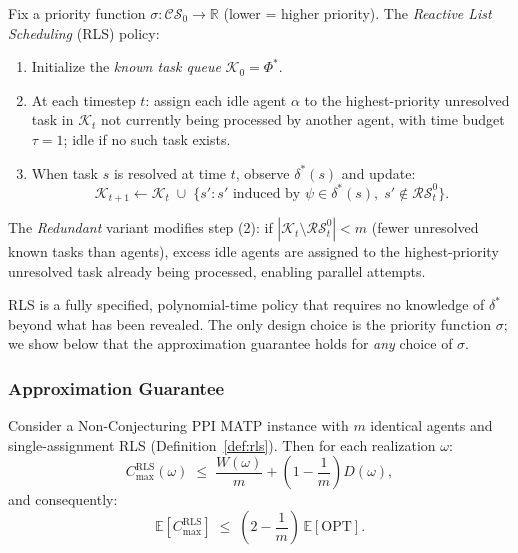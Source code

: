 \begin{definition}\label{def:rls}
Fix a priority function $\sigma:\mathcal{CS}_0\to\mathbb{R}$ (lower = higher priority). The \emph{Reactive List Scheduling} (RLS) policy:
\begin{enumerate}
    \item Initialize the \emph{known task queue} $\mathcal{K}_0 = \Phi^*$.
    \item At each timestep $t$: assign each idle agent $\alpha$ to the highest-priority unresolved task in $\mathcal{K}_t$ not currently being processed by another agent, with time budget $\tau=1$; idle if no such task exists.
    \item When task $s$ is resolved at time $t$, observe $\delta^*(s)$ and update:
    \[
    \mathcal{K}_{t+1} \leftarrow \mathcal{K}_t \;\cup\; \{s' : s'\text{ induced by }\psi\in\delta^*(s),\; s'\notin\mathcal{RS}^0_t\}.
    \]
\end{enumerate}
\end{definition}

\begin{definition}\label{def:or-rls}
The \emph{Redundant} variant modifies step (2): if $|\mathcal{K}_t \setminus \mathcal{RS}^0_t| < m$ (fewer unresolved known tasks than agents), excess idle agents are assigned to the highest-priority unresolved task already being processed, enabling parallel attempts.
\end{definition}

RLS is a fully specified, polynomial-time policy that requires no knowledge of $\delta^*$ beyond what has been revealed. The only design choice is the priority function $\sigma$; we show below that the approximation guarantee holds for \emph{any} choice of $\sigma$.


\subsubsection{Approximation Guarantee}

\begin{theorem}\label{thm:rls-approx}
Consider a Non-Conjecturing PPI MATP instance with $m$ identical agents and single-assignment RLS (Definition~\ref{def:rls}). Then for each realization $\omega$:
\[
C_{\max}^{\mathrm{RLS}}(\omega) \;\le\; \frac{W(\omega)}{m} + \left(1 - \frac{1}{m}\right) D(\omega),
\]
and consequently:
\[
\mathbb{E}[C_{\max}^{\mathrm{RLS}}] \;\le\; \left(2 - \frac{1}{m}\right)\,\mathbb{E}[\mathrm{OPT}].
\]
\end{theorem}

